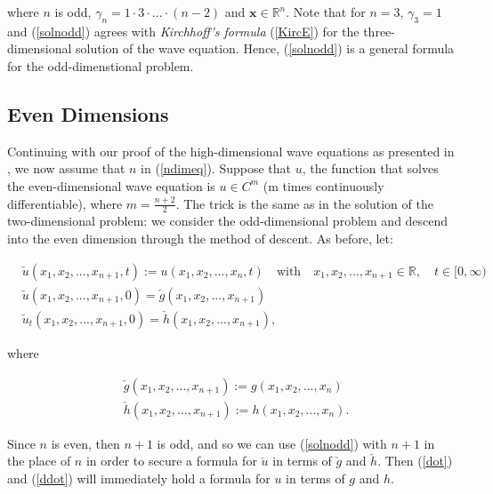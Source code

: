 \documentclass[a4paper, 12pt]{article}
\numberwithin{equation}{section}
\begin{document}
where $n$ is odd, $\gamma_n=1 \cdot 3 \cdot ... \cdot (n-2)$ and $\boldsymbol{x}\in \mathbb{R}^n$. Note that for $n=3$, $\gamma_3 = 1$ and (\ref{solnodd}) agrees with 
\emph{Kirchhoff's formula} (\ref{KircE}) for the three-dimensional solution of the wave equation. Hence, (\ref{solnodd}) is a general formula for the odd-dimenstional problem.

\subsection{Even Dimensions}
Continuing with our proof of the high-dimensional wave equations as presented in \cite{Ev}, we now assume that $n$ in (\ref{ndimeq}). Suppose that $u$, the function that 
solves the even-dimensional wave equation is $u \in C^m$ (m times continuously differentiable), where $m=\frac{n+2}{2}$. The trick is the same as in the solution of the 
two-dimensional problem: we consider the odd-dimensional problem and descend into the even dimension through the method of descent. As before, let:

\begin{equation} \label{dot}
    \begin{aligned}
        &\check{u}(x_1, x_2, ..., x_{n+1}, t):=u(x_1, x_2, ..., x_n, t) \quad \textrm{with} \quad x_1, x_2, ..., x_{n+1} \in \mathbb{R}, \quad t \in [0, \infty)\\
        &\check{u}(x_1, x_2, ..., x_{n+1}, 0)=\check{g}(x_1, x_2, ..., x_{n+1})\\
        &\check{u}_t(x_1, x_2, ..., x_{n+1}, 0)=\check{h}(x_1, x_2, ..., x_{n+1}),
    \end{aligned}
\end{equation}

where 

\begin{equation} \label{ddot}
    \begin{aligned}
        &\check{g}(x_1, x_2, ..., x_{n+1}):=g(x_1, x_2, ..., x_n)\\
        &\check{h}(x_1, x_2, ..., x_{n+1}):=h(x_1, x_2, ..., x_n).
    \end{aligned}
\end{equation}

Since $n$ is even, then $n+1$ is odd, and so we can use (\ref{solnodd}) with $n+1$ in the place of $n$ in order to secure a formula for $\check{u}$ 
in terms of $\check{g}$ and $\check{h}$. Then (\ref{dot}) and (\ref{ddot}) will immediately hold a formula for $u$ in terms of $g$ and $h$.
\\
\end{document}

